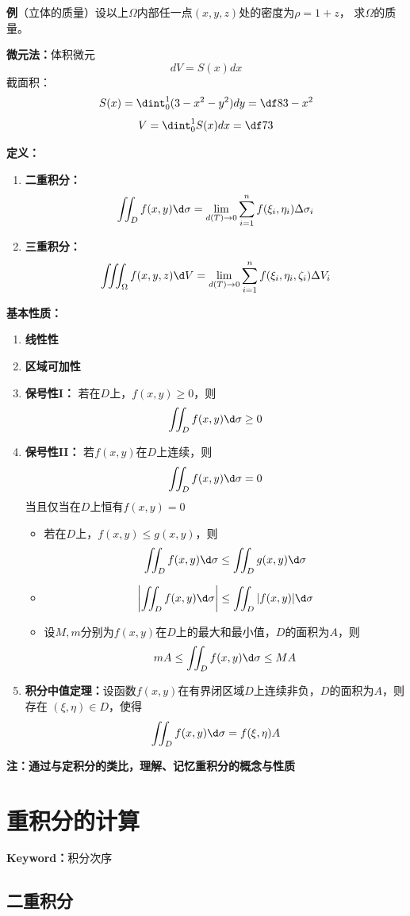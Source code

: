 {\bf 例}（立体的质量）设以上$\Omega$内部任一点$(x,y,z)$处的密度为$\rho=1+z$，
求$\Omega$的质量。

{\bf 微元法：}体积微元
$$dV=S(x)dx$$
截面积：
$$S(x)=\dint_0^1(3-x^2-y^2)dy=\df 83-x^2$$
$$V=\dint_0^1S(x)dx=\df 73$$

{\bf 定义：}
\begin{enumerate}[(1)]
  \setlength{\itemindent}{1cm}
  \item {\bf 二重积分：} 
  $$\iint_Df(x,y)\d\sigma=\lim_{d(T)\to
  0}\sum_{i=1}^nf(\xi_i,\eta_i)\Delta\sigma_i$$ 
  \item {\bf 三重积分：} 
  $$\iiint_{\Omega}f(x,y,z)\d V=\lim_{d(T)\to
  0}\sum_{i=1}^nf(\xi_i,\eta_i,\zeta_i)\Delta V_i$$
\end{enumerate}

{\bf 基本性质：}
\begin{enumerate}[(1)]
  \setlength{\itemindent}{1cm}
  \item {\bf 线性性} 
  \item {\bf 区域可加性} 
  \item {\bf 保号性I：} 若在$D$上，$f(x,y)\geq 0$，则
  $$\iint_Df(x,y)\d\sigma\geq 0$$ 
  \item {\bf 保号性II：} 若$f(x,y)$在$D$上连续，则
  $$\iint_Df(x,y)\d\sigma=0$$
  当且仅当在$D$上恒有$f(x,y)=0$
    \begin{itemize}
	  \item 若在$D$上，$f(x,y)\leq g(x,y)$，则
	  $$\iint_Df(x,y)\d\sigma\leq\iint_Dg(x,y)\d\sigma$$ 
	  \item $$\left|\iint_Df(x,y)\d\sigma\right|\leq\iint_D|f(x,y)|\d\sigma$$ 
	  \item 设$M,m$分别为$f(x,y)$在$D$上的最大和最小值，$D$的面积为$A$，则
	  $$mA\leq\iint_Df(x,y)\d\sigma\leq MA$$
	\end{itemize}
  \item {\bf 积分中值定理：}设函数$f(x,y)$在有界闭区域$D$上连续非负，$D$的面积为$A$，则存在
	$(\xi,\eta)\in D$，使得
	$$\iint_Df(x,y)\d\sigma=f(\xi,\eta)A$$
\end{enumerate}

{\bf 注：通过与定积分的类比，理解、记忆重积分的概念与性质}

\section{重积分的计算}

{\bf Keyword：}积分次序

\subsection{二重积分}


